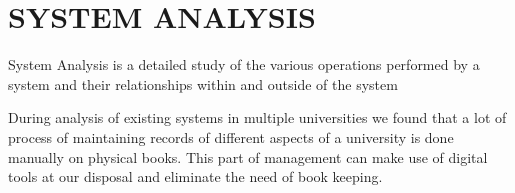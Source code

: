 \section{SYSTEM ANALYSIS}

System Analysis is a detailed study of the various operations performed by a
system and their relationships within and outside of the system

During analysis of existing systems in multiple universities we found that a
lot of process of maintaining records of different aspects of a university is
done manually on physical books. This part of management can make use of
digital tools at our disposal and eliminate the need of book keeping.
